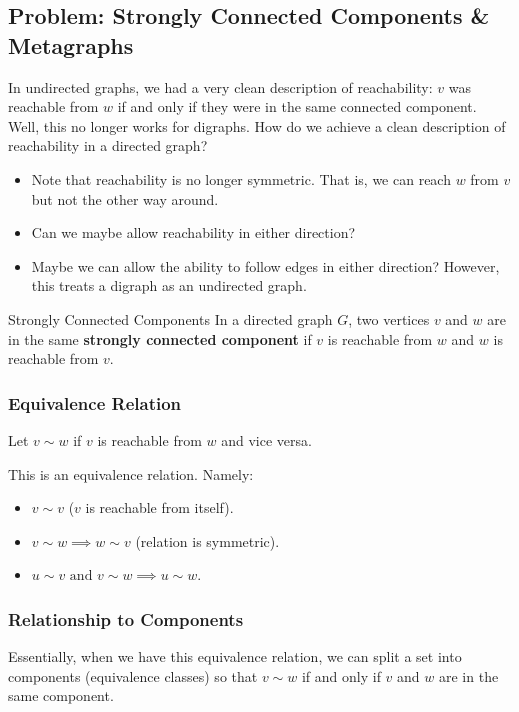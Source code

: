 \documentclass[letterpaper]{article}
\begin{document}
\subsection{Problem: Strongly Connected Components \& Metagraphs}
In undirected graphs, we had a very clean description of reachability: $v$ was reachable from $w$ if and only if they were in the same connected component. Well, this no longer works for digraphs. How do we achieve a clean description of reachability in a directed graph? 
\begin{itemize}
    \item Note that reachability is no longer symmetric. That is, we can reach $w$ from $v$ but not the other way around. 
    \item Can we maybe allow reachability in either direction?
    \item Maybe we can allow the ability to follow edges in either direction? However, this treats a digraph as an undirected graph. 
\end{itemize}

\begin{definition}{Strongly Connected Components}{}
    In a directed graph $G$, two vertices $v$ and $w$ are in the same \textbf{strongly connected component} if $v$ is reachable from $w$ and $w$ is reachable from $v$.
\end{definition}

\subsubsection{Equivalence Relation}
Let $v \sim w$ if $v$ is reachable from $w$ and vice versa.
\begin{proposition}
    This is an equivalence relation. Namely:
    \begin{itemize}
        \item $v \sim v$ ($v$ is reachable from itself).
        \item $v \sim w \implies w \sim v$ (relation is symmetric).
        \item $u \sim v \text{ and } v \sim w \implies u \sim w$.
    \end{itemize}
\end{proposition}

\subsubsection{Relationship to Components}
Essentially, when we have this equivalence relation, we can split a set into components (equivalence classes) so that $v \sim w$ if and only if $v$ and $w$ are in the same component.
\end{document}
